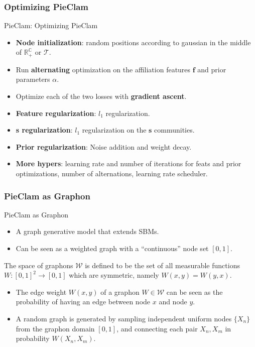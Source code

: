 \documentclass{beamer}
\begin{document}
\subsubsection{Optimizing PieClam}
\begin{frame}{PieClam: Optimizing PieClam}
    \begin{itemize}[itemsep=1em, label=\textbullet]
        \item \textbf{Node initialization}: random positions according to gaussian in the middle of $\mathbb{R_+^C}$ or $\mathcal{T}$.
        \item Run \textbf{alternating} optimization on the affiliation features $\mathbf{f}$ and prior parameters $\alpha$.
        \item Optimize each of the two losses with \textbf{gradient ascent}.
        \item \textbf{Feature regularization}: $l_1$ regularization.
        \item \textbf{s regularization}: $l_1$ regularization on the $\mathbf{s}$ communities.
        \item \textbf{Prior regularization}: Noise addition and weight decay.
        \item \textbf{More hypers}: learning rate and number of iterations for feats and prior optimizations, number of alternations, learning rate scheduler.
    \end{itemize}
\end{frame}

\subsubsection{PieClam as Graphon}
\begin{frame}{PieClam as Graphon}
    
\begin{itemize}[label=\textbullet]
\item A graph generative model that extends SBMs.
\item Can be seen as a weighted graph with a ``continuous'' node set $[0,1]$. 
\end{itemize}

\begin{definition}
The space of graphons $\mathcal{W}$ is defined to be the set of all measurable functions  $W:[0,1]^2\rightarrow [0,1]$ which are symmetric, namely $W(x,y)=W(y,x)$. 
\end{definition}
\begin{itemize}[label=\textbullet]
\item The edge weight $W(x,y)$ of a graphon $W\in \mathcal{W}$ can be seen as the probability of having an edge between node $x$ and node $y$.
\item A random graph is generated by sampling  independent uniform nodes $\{X_n\}$ from the graphon domain $[0,1]$, and connecting each pair $X_n,X_m$ in probability $W(X_n,X_m)$.
\end{itemize}
\end{frame}
\end{document}
